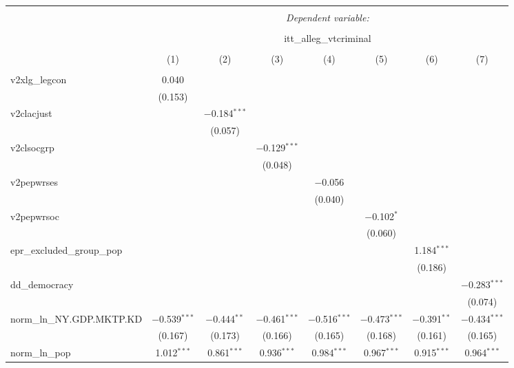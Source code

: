
\begin{sidewaystable}[!htbp] \centering 
  \caption{} 
  \label{} 
\tiny 
\begin{tabular}{@{\extracolsep{5pt}}lccccccc} 
\\[-1.8ex]\hline 
\hline \\[-1.8ex] 
 & \multicolumn{7}{c}{\textit{Dependent variable:}} \\ 
\cline{2-8} 
\\[-1.8ex] & \multicolumn{7}{c}{itt\_alleg\_vtcriminal} \\ 
\\[-1.8ex] & (1) & (2) & (3) & (4) & (5) & (6) & (7)\\ 
\hline \\[-1.8ex] 
 v2xlg\_legcon & 0.040 &  &  &  &  &  &  \\ 
  & (0.153) &  &  &  &  &  &  \\ 
  v2clacjust &  & $-$0.184$^{***}$ &  &  &  &  &  \\ 
  &  & (0.057) &  &  &  &  &  \\ 
  v2clsocgrp &  &  & $-$0.129$^{***}$ &  &  &  &  \\ 
  &  &  & (0.048) &  &  &  &  \\ 
  v2pepwrses &  &  &  & $-$0.056 &  &  &  \\ 
  &  &  &  & (0.040) &  &  &  \\ 
  v2pepwrsoc &  &  &  &  & $-$0.102$^{*}$ &  &  \\ 
  &  &  &  &  & (0.060) &  &  \\ 
  epr\_excluded\_group\_pop &  &  &  &  &  & 1.184$^{***}$ &  \\ 
  &  &  &  &  &  & (0.186) &  \\ 
  dd\_democracy &  &  &  &  &  &  & $-$0.283$^{***}$ \\ 
  &  &  &  &  &  &  & (0.074) \\ 
  norm\_ln\_NY.GDP.MKTP.KD & $-$0.539$^{***}$ & $-$0.444$^{**}$ & $-$0.461$^{***}$ & $-$0.516$^{***}$ & $-$0.473$^{***}$ & $-$0.391$^{**}$ & $-$0.434$^{***}$ \\ 
  & (0.167) & (0.173) & (0.166) & (0.165) & (0.168) & (0.161) & (0.165) \\ 
  norm\_ln\_pop & 1.012$^{***}$ & 0.861$^{***}$ & 0.936$^{***}$ & 0.984$^{***}$ & 0.967$^{***}$ & 0.915$^{***}$ & 0.964$^{***}$ \\ 

\end{tabular}
\end{sidewaystable}
